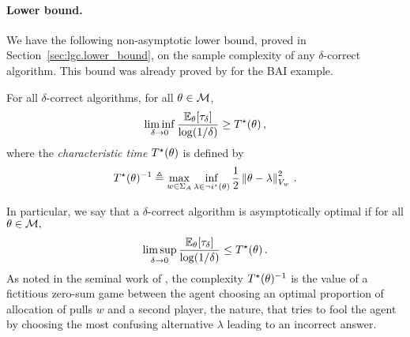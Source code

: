 \paragraph{Lower bound.}
We have the following non-asymptotic lower bound, proved in Section~\ref{sec:lgc.lower_bound}, on the sample complexity of any $\delta$-correct algorithm. This bound was already proved by \citet{soare2014linear} for the BAI example.
\begin{theorem}
\label{th:lb_genral}
For all $\delta$-correct algorithms, for all $\theta\in \mathcal{M}$,
\begin{equation*}
  \label{eq:lb_general}
  \liminf_{\delta\to 0}\frac{\mathbb{E}_\theta[\tau_{\delta}]}{\log(1/\delta)} \geq T^{\star}(\theta) \,,
\end{equation*}
where the \emph{characteristic time} $T^{\star}(\theta)$ is defined by
\[
T^{\star}(\theta)^{-1} \triangleq \max_{w \in \Sigma_A} \inf_{\lambda\in \neg i^\star(\theta)} \frac{1}{2}\left\lVert\theta - \lambda\right\rVert_{V_w}^2\,.
\]
\end{theorem}
In particular, we say that a $\delta$-correct algorithm is asymptotically optimal if for all $\theta\in\mathcal{M},$
\[
\limsup_{\delta\to 0}\frac{\mathbb{E}_\theta[\tau_{\delta}]}{\log(1/\delta)} \leq T^{\star}(\theta)\,.
\]
As noted in the seminal work of \citet{chernoff1959}, the complexity $T^{\star}(\theta)^{-1}$ is the value of a fictitious zero-sum game between the agent choosing an optimal proportion of allocation of pulls $w$ and a second player, the nature, that tries to fool the agent by choosing the most confusing alternative $\lambda$ leading to an incorrect answer.

